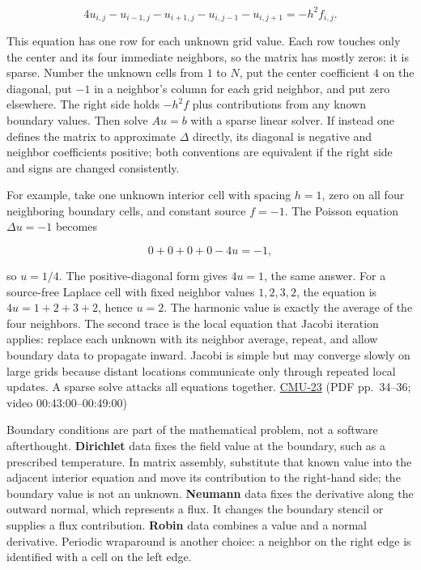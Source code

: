 \[
4u_{i,j}-u_{i-1,j}-u_{i+1,j}-u_{i,j-1}-u_{i,j+1}=-h^2f_{i,j}.
\]

This equation has one row for each unknown grid value. Each row touches only the center and its four immediate neighbors, so the matrix has mostly zeros: it is sparse. Number the unknown cells from \(1\) to \(N\), put the center coefficient \(4\) on the diagonal, put \(-1\) in a neighbor's column for each grid neighbor, and put zero elsewhere. The right side holds \(-h^2f\) plus contributions from any known boundary values. Then solve \(Au=b\) with a sparse linear solver. If instead one defines the matrix to approximate \(\Delta\) directly, its diagonal is negative and neighbor coefficients positive; both conventions are equivalent if the right side and signs are changed consistently.

For example, take one unknown interior cell with spacing \(h=1\), zero on all four neighboring boundary cells, and constant source \(f=-1\). The Poisson equation \(\Delta u=-1\) becomes

\[
0+0+0+0-4u=-1,
\]

so \(u=1/4\). The positive-diagonal form gives \(4u=1\), the same answer. For a source-free Laplace cell with fixed neighbor values \(1,2,3,2\), the equation is \(4u=1+2+3+2\), hence \(u=2\). The harmonic value is exactly the average of the four neighbors. The second trace is the local equation that Jacobi iteration applies: replace each unknown with its neighbor average, repeat, and allow boundary data to propagate inward. Jacobi is simple but may converge slowly on large grids because distant locations communicate only through repeated local updates. A sparse solve attacks all equations together. \hyperref[04-visual-computing-ii-ch036-cmu-23---physically-based-animation-and-pdes]{CMU-23} (PDF pp.~34--36; video 00:43:00--00:49:00)

Boundary conditions are part of the mathematical problem, not a software afterthought. \textbf{Dirichlet} data fixes the field value at the boundary, such as a prescribed temperature. In matrix assembly, substitute that known value into the adjacent interior equation and move its contribution to the right-hand side; the boundary value is not an unknown. \textbf{Neumann} data fixes the derivative along the outward normal, which represents a flux. It changes the boundary stencil or supplies a flux contribution. \textbf{Robin} data combines a value and a normal derivative. Periodic wraparound is another choice: a neighbor on the right edge is identified with a cell on the left edge.

